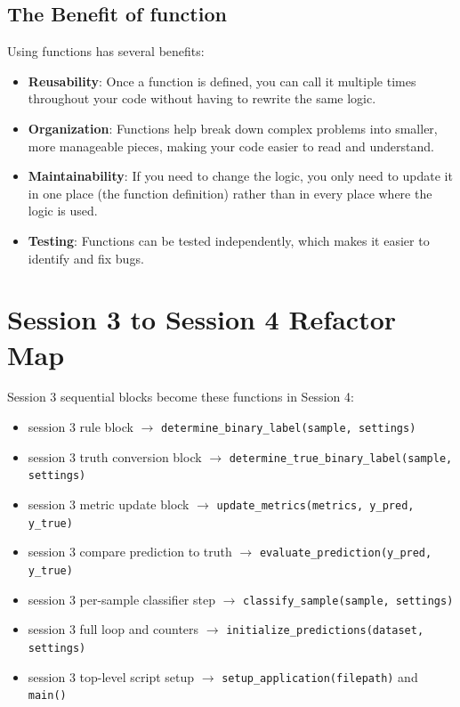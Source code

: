 \subsection{The Benefit of function}
Using functions has several benefits:
\begin{itemize}
    \item \textbf{Reusability}: Once a function is defined, you can call it multiple times throughout your code without having to rewrite the same logic.
    \item \textbf{Organization}: Functions help break down complex problems into smaller, more manageable pieces, making your code easier to read and understand.
    \item \textbf{Maintainability}: If you need to change the logic, you only need to update it in one place (the function definition) rather than in every place where the logic is used.
    \item \textbf{Testing}: Functions can be tested independently, which makes it easier to identify and fix bugs.
\end{itemize}


\section{Session 3 to Session 4 Refactor Map}
Session 3 sequential blocks become these functions in Session 4:

\begin{itemize}
    \item session 3 rule block $\rightarrow$ \texttt{determine\_binary\_label(sample, settings)}
    \item session 3 truth conversion block $\rightarrow$ \texttt{determine\_true\_binary\_label(sample, settings)}
    \item session 3 metric update block $\rightarrow$ \texttt{update\_metrics(metrics, y\_pred, y\_true)}
    \item session 3 compare prediction to truth $\rightarrow$ \texttt{evaluate\_prediction(y\_pred, y\_true)}
    \item session 3 per-sample classifier step $\rightarrow$ \texttt{classify\_sample(sample, settings)}
    \item session 3 full loop and counters $\rightarrow$ \texttt{initialize\_predictions(dataset, settings)}
    \item session 3 top-level script setup $\rightarrow$ \texttt{setup\_application(filepath)} and \texttt{main()}
\end{itemize}

